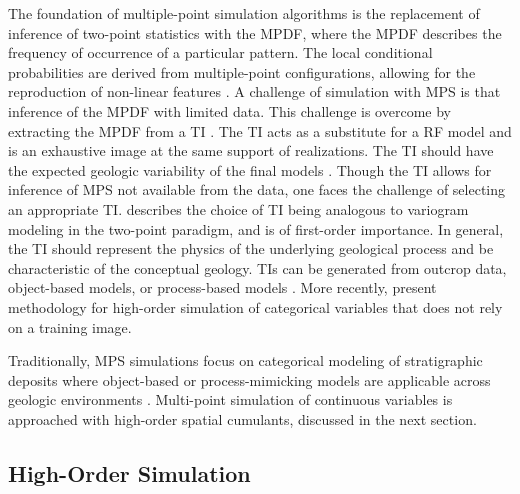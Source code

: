 The foundation of multiple-point simulation algorithms \citep{guardiano1993multivariate,strebelle2002conditional} is the replacement of inference of two-point statistics with the \gls{MPDF}, where the \gls{MPDF} describes the frequency of occurrence of a particular pattern. The local conditional probabilities are derived from multiple-point configurations, allowing for the reproduction of non-linear features \citep{silva2014guide}. A challenge of simulation with \gls{MPS} is that inference of the \gls{MPDF} with limited data. This challenge is overcome by extracting the \gls{MPDF} from a \gls{TI} \citep{journel2005covariance}. The \gls{TI} acts as a substitute for a \gls{RF} model and is an exhaustive image at the same support of realizations. The \gls{TI} should have the expected geologic variability of the final models \citep{gomez-hernandez2021one}. Though the \gls{TI} allows for inference of \gls{MPS} not available from the data, one faces the challenge of selecting an appropriate \gls{TI}. \cite{boisvert2007multiplepoint} describes the choice of \gls{TI} being analogous to variogram modeling in the two-point paradigm, and is of first-order importance. In general, the TI should represent the physics of the underlying geological process and be characteristic of the conceptual geology. \Glspl{TI} can be generated from outcrop data, object-based models, or process-based models \citep{tahmasebi2018multiple}. More recently, \cite{minniakhmetov2022highorder} present methodology for high-order simulation of categorical variables that does not rely on a training image.

Traditionally, \gls{MPS} simulations focus on categorical modeling of stratigraphic deposits where object-based or process-mimicking models are applicable across geologic environments \citep{mariethoz2014multiplepoint}. Multi-point simulation of continuous variables is approached with high-order spatial cumulants, discussed in the next section.


\FloatBarrier
\subsection{High-Order Simulation}
\label{subsec:03hosim}

